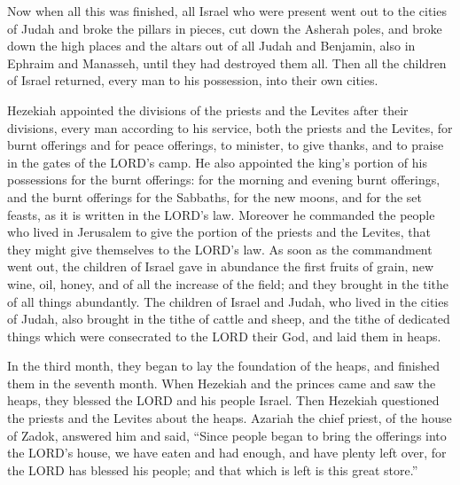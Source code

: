 \mychapter{} \myverse*{}Now when all this was finished, all Israel who were present went
out to the cities of Judah and broke the pillars in pieces, cut down the Asherah poles, and broke down
the high places and the altars out of all Judah and Benjamin, also in Ephraim and Manasseh, until they
had destroyed them all. Then all the children of Israel returned, every man to his possession, into their
own cities.

\myverse{}Hezekiah appointed the divisions of the priests and the Levites
after their divisions, every man according to his service, both the priests and the Levites, for burnt
offerings and for peace offerings, to minister, to give thanks, and to praise in the gates of the LORD’s
camp.
\myverse{}He also appointed the king’s portion of his possessions for the burnt offerings:
for the morning and evening burnt offerings, and the burnt offerings for the Sabbaths, for the new moons,
and for the set feasts, as it is written in the LORD’s law.
\myverse{}Moreover he commanded the people who lived in Jerusalem to give the portion
of the priests and the Levites, that they might give themselves to the LORD’s law.
\myverse{}As soon as the commandment went out, the children of Israel gave in abundance
the first fruits of grain, new wine, oil, honey, and of all the increase of the field; and they brought
in the tithe of all things abundantly.
\myverse{}The children of Israel and Judah, who lived in the cities of Judah, also brought
in the tithe of cattle and sheep, and the tithe of dedicated things which were consecrated to the LORD
their God, and laid them in heaps.

\myverse{}In the third month, they began to lay the foundation of the heaps,
and finished them in the seventh month.
\myverse{}When Hezekiah and the princes came and saw the heaps, they blessed the LORD
and his people Israel.
\myverse{}Then Hezekiah questioned the priests and the Levites about the heaps.
\myverse{}Azariah the chief priest, of the house of Zadok, answered him and said, “Since
people began to bring the offerings into the LORD’s house, we have eaten and had enough, and have plenty
left over, for the LORD has blessed his people; and that which is left is this great store.”

